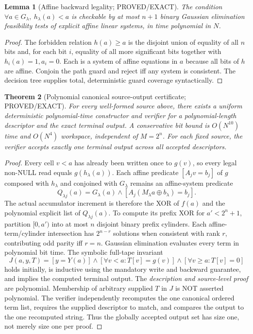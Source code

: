 \documentclass[11pt]{article}
\newtheorem{theorem}{Theorem}
\newtheorem{lemma}[theorem]{Lemma}
\begin{document}
\begin{lemma}[Affine backward legality; PROVED/EXACT]
The condition \(\forall a\in G_\lambda,\ h_\lambda(a)<a\) is checkable by at most \(n+1\) binary Gaussian elimination feasibility tests of explicit affine linear systems, in time polynomial in \(N\).
\end{lemma}
\begin{proof}
The forbidden relation \(h(a)\ge a\) is the disjoint union of equality of all \(n\) bits and, for each bit \(i\), equality of all more significant bits together with \(h_i(a)=1,a_i=0\). Each is a system of affine equations in \(a\) because all bits of \(h\) are affine. Conjoin the path guard and reject iff any system is consistent. The decision tree supplies total, deterministic guard coverage syntactically.
\end{proof}

\begin{theorem}[Polynomial canonical source-output certificate; PROVED/EXACT]
For every well-formed source above, there exists a \emph{uniform} deterministic polynomial-time constructor and verifier for a polynomial-length descriptor and the exact terminal output. A conservative bit bound is \(O(N^{10})\) time and \(O(N^4)\) workspace, independent of \(M=2^n\). For each fixed source, the verifier accepts exactly one terminal output across \emph{all} accepted descriptors.
\end{theorem}
\begin{proof}
Every cell \(v<a\) has already been written once to \(g(v)\), so every legal non-NULL read equals \(g(h_\lambda(a))\). Each affine predicate \([A_jv=b_j]\) of \(g\) composed with \(h_\lambda\) and conjoined with \(G_\lambda\) remains an affine-system predicate
\[
 Q_{\lambda j}(a)=G_\lambda(a)\land[A_j(M_\lambda a\oplus b_\lambda)=b_j].
\]
The actual accumulator increment is therefore the XOR of \(f(a)\) and the polynomial explicit list of \(Q_{\lambda j}(a)\). To compute its prefix XOR for \(a'< 2^n+1\), partition \([0,a')\) into at most \(n\) disjoint binary prefix cylinders. Each affine-term/cylinder intersection has \(2^{n-r}\) solutions when consistent with rank \(r\), contributing odd parity iff \(r=n\). Gaussian elimination evaluates every term in polynomial bit time. The symbolic full-tape invariant
\[
 J(a,y,T)=[y=Y(a)]\land[\forall v<a:T[v]=g(v)]\land[\forall v\ge a:T[v]=0]
\]
holds initially, is inductive using the mandatory write and backward guarantee, and implies the computed terminal output. The \emph{description and source-level proof} are polynomial. Membership of arbitrary supplied \(T\) in \(J\) is NOT asserted polynomial. The verifier independently recomputes the one canonical ordered term list, requires the supplied descriptor to match, and compares the output to the one recomputed string. Thus the globally accepted output set has size one, not merely size one per proof.
\end{proof}
\end{document}
